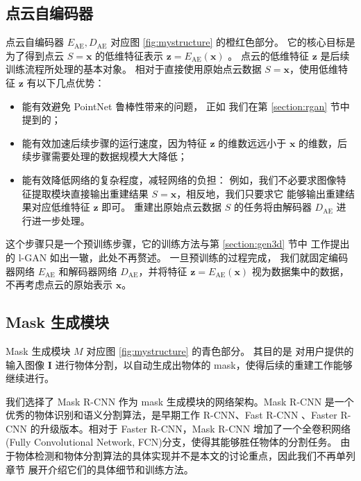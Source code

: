 \subsection{点云自编码器\label{section:myae}}
点云自编码器 $E_{\text{AE}}, D_{\text{AE}}$ 对应图 \ref{fig:mystructure} 的橙红色部分。
它的核心目标是为了得到点云 $S = \bm x$ 的低维特征表示 $\bm z = E_{\text{AE}}(\bm x)$%
。%
点云的低维特征 $\bm z$ 是后续训练流程所处理的基本对象。
相对于直接使用原始点云数据 $S = \bm x$，使用低维特征 $\bm z$ 有以下几点优势：
\begin{itemize}
	\item 能有效避免 PointNet\cite{pointnet} 鲁棒性带来的问题，%
	      正如
	      我们在第 \ref{section:rgan} 节中%
	      提到的；%
	\item 能有效加速后续步骤的运行速度，因为特征 $\bm z$ 的维数远远小于 $\bm x$ 的维数，后续步骤需要处理的数据规模大大降低；
	\item
	      能有效降低网络的复杂程度，减轻网络的负担：
	      例如，我们不必要求图像特征提取模块直接输出重建结果 $S = \bm x$，相反地，我们只要求它
	      能够输出重建结果对应低维特征 $\bm z$ 即可。
	      重建出原始点云数据 $S$ 的任务将由解码器 $D_{\text{AE}}$ 进行进一步处理。

\end{itemize}

这个步骤只是一个预训练步骤，它的训练方法与第  \ref{section:gen3d} 节中  工作提出的 l-GAN 如出一辙，此处不再赘述。
一旦预训练的过程完成，
我们就固定编码器网络 $E_{\text{AE}}$ 和解码器网络 $D_{\text{AE}}$，并将特征
$\bm z = E_{\text{AE}}(\bm x)$ 视为数据集中的数据，不再考虑点云的原始表示 $\bm x$。

\subsection{Mask 生成模块 \label{my:mask}}
Mask 生成模块 $M$ 对应图 \ref{fig:mystructure} 的青色部分。
其目的是
对用户提供的输入图像 $\bm I$ %
进行物体分割，以自动生成出物体的 mask，使得后续的重建工作能够继续进行。

我们选择了 Mask R-CNN \cite{maskrcnn} 作为 mask 生成模块的网络架构。Mask R-CNN 是一个优秀的物体识别和语义分割算法，是早期工作 R-CNN\cite{rcnn}、Fast R-CNN\cite{fastrcnn}
、Faster R-CNN\cite{fasterrcnn} 的升级版本。相对于 Faster R-CNN，Mask R-CNN 增加了一个全卷积网络 (Fully Convolutional Network, FCN)分支，使得其能够胜任物体的分割任务。
由于物体检测和物体分割算法的具体实现并不是本文的讨论重点，因此我们不再单列章节%
展开介绍它们的具体细节和训练方法。%

